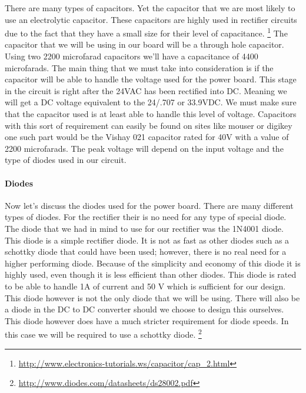 There are many types of capacitors. Yet the capacitor that we are most likely
to use an electrolytic capacitor. These capacitors are highly used in
rectifier circuits due to the fact that they have a small size for their level
of capacitance.
\footnote{\url{http://www.electronics-tutorials.ws/capacitor/cap_2.html}} The capacitor
that we will be using in our board will be a through hole capacitor. Using two
2200 microfarad capacitors we{}'ll have a capacitance of 4400 microfarads. The
main thing that we must take into consideration is if the capacitor will be
able to handle the voltage used for the power board. This stage in the circuit
is right after the 24VAC has been rectified into DC. Meaning we will get a DC
voltage equivalent to the 24/.707 or 33.9VDC. We must make sure that the
capacitor used is at least able to handle this level of voltage.
Capacitors with this sort of requirement can easily be found on sites like
mouser or digikey one such part would be the Vishay 021 capacitor rated for 40V
with a value of 2200 microfarads. The peak voltage will depend on the input
voltage and the type of diodes used in our circuit.

\paragraph{Diodes}

Now let{}'s discuss the diodes used for the power board. There are many
different types of diodes. For the rectifier their is no need for any type of
special diode. The diode that we had in mind to use for our rectifier was the
1N4001 diode. This diode is a simple rectifier diode. It is not as fast as
other diodes such as a schottky diode that could have been used; however, there
is no real need for a higher performing diode. Because of the simplicity and
economy of this diode it is highly used, even though it is less efficient than
other diodes. This diode is rated to be able to handle 1A of current and 50 V
which is sufficient for our design. This diode however is not the only diode
that we will be using. There will also be a diode in the DC to DC converter
should we choose to design this ourselves. This diode however does have a much
stricter requirement for diode speeds. In this case we will be required to use
a schottky diode.
\footnote{\url{http://www.diodes.com/datasheets/ds28002.pdf}}

